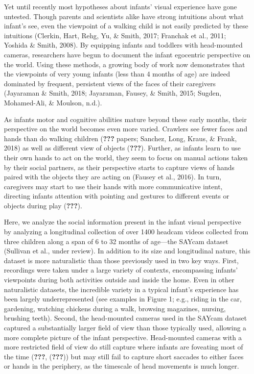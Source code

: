 \documentclass[10pt, letterpaper]{article}
\begin{document}
Yet until recently most hypotheses about infants' visual experience have
gone untested. Though parents and scientists alike have strong
intuitions about what infant's see, even the viewpoint of a walking
child is not easily predicted by these intuitions (Clerkin, Hart, Rehg,
Yu, \& Smith, 2017; Franchak et al., 2011; Yoshida \& Smith, 2008). By
equipping infants and toddlers with head-mounted cameras, researchers
have begun to document the infant egocentric perspective on the world.
Using these methods, a growing body of work now demonstrates that the
viewpoints of very young infants (less than 4 months of age) are indeed
dominated by frequent, persistent views of the faces of their caregivers
(Jayaraman \& Smith, 2018; Jayaraman, Fausey, \& Smith, 2015; Sugden,
Mohamed-Ali, \& Moulson, n.d.).

As infants motor and cognitive abilities mature beyond these early
months, their perspective on the world becomes even more varied.
Crawlers see fewer faces and hands than do walking children
({\textbf{???}} papers; Sanchez, Long, Kraus, \& Frank, 2018) as well as
different view of objects ({\textbf{???}}). Further, as infants learn to
use their own hands to act on the world, they seem to focus on manual
actions taken by their social partners, as their perspective starts to
capture views of hands paired with the objects they are acting on
(Fausey et al., 2016). In turn, caregivers may start to use their hands
with more communicative intent, directing infants attention with
pointing and gestures to different events or objects during play
({\textbf{???}}).

Here, we analyze the social information present in the infant visual
perspective by analyzing a longitudinal collection of over 1400 headcam
videos collected from three children along a span of 6 to 32 months of
age---the SAYcam dataset (Sullivan et al., under review). In addition to
its size and longitudinal nature, this dataset is more naturalistic than
those previously used in two key ways. First, recordings were taken
under a large variety of contexts, encompassing infants' viewpoints
during both activities outside and inside the home. Even in other
naturalistic datasets, the incredible variety in a typical infant's
experience has been largely underrepresented (see examples in Figure 1;
e.g., riding in the car, gardening, watching chickens during a walk,
browsing magazines, nursing, brushing teeth). Second, the head-mounted
cameras used in the SAYcam dataset captured a substantially larger field
of view than those typically used, allowing a more complete picture of
the infant perspective. Head-mounted cameras with a more restricted
field of view do still capture where infants are foveating most of the
time ({\textbf{???}}, ({\textbf{???}})) but may still fail to capture
short saccades to either faces or hands in the periphery, as the
timescale of head movements is much longer.
\end{document}
